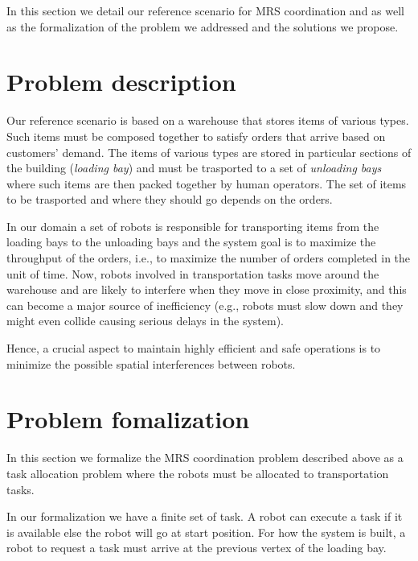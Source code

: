 In this section we detail our reference scenario for MRS coordination and as well 
as the formalization of the problem we addressed and the solutions we propose.

\section{Problem description}
Our reference scenario is based on a warehouse that stores items of various types.
Such items must be composed together to satisfy orders that arrive based on customers’ demand.
The items of various types are stored in particular sections of the building (\textit{loading bay})
and must be trasported to a set of \textit{unloading bays} where such items are then 
packed together by human operators. The set of items to be trasported and where they should
go depends on the orders.

In our domain a set of robots is responsible for transporting items from
the loading bays to the unloading bays and the system goal is to maximize the
throughput of the orders, i.e., to maximize the number of orders completed in
the unit of time. Now, robots involved in transportation tasks move around
the warehouse and are likely to interfere when they move in close proximity,
and this can become a major source of inefficiency (e.g., robots must slow down
and they might even collide causing serious delays in the system).

Hence, a crucial aspect to maintain highly efficient and safe operations is to minimize the
possible spatial interferences between robots.


\section{Problem fomalization}
In this section we formalize the MRS coordination problem described above as a task allocation problem
where the robots must be allocated to transportation tasks. 

In our formalization we have a finite set of task. A robot can execute a task if it is available else the robot will go at start position.
For how the system is built, a robot to request a task must arrive at the previous vertex of the loading bay.


